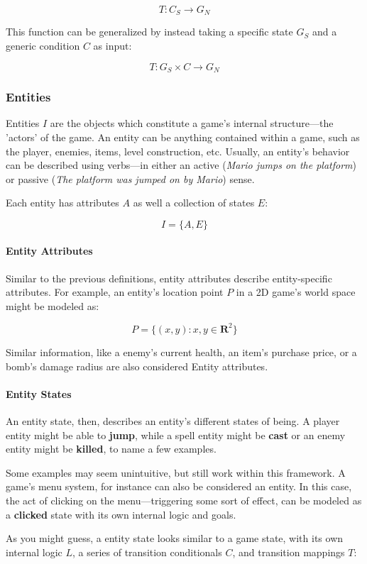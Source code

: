 \documentclass{report}
\begin{document}
$$
T: C_S \longrightarrow G_N
$$

This function can be generalized by instead taking a specific state $G_S$ and a generic condition $C$ as input:

$$
T: G_S \times C \longrightarrow G_N
$$

\subsubsection{Entities}
Entities $I$ are the objects which constitute a game's internal structure---the 'actors' of the game. An entity can be anything contained within a game, such as the player, enemies, items, level construction, etc.  Usually, an entity's behavior can be described using verbs---in either an active (\emph{Mario jumps on the platform}) or passive (\emph{The platform was jumped on by Mario}) sense.

Each entity has attributes $A$ as well a collection of states $E$:

$$I = \{A, E\}$$

\paragraph{Entity Attributes}
Similar to the previous definitions, entity attributes describe entity-specific attributes. For example, an entity's location point $P$ in a 2D game's world space might be modeled as:

$$P = \{(x,y): x,y \in \mathbf{R} ^2\}$$ 

Similar information, like a enemy's current health, an item's purchase price, or a bomb's damage radius are also considered Entity attributes. 

\paragraph{Entity States}
An entity state, then, describes an entity's different states of being. A player entity might be able to \textbf{jump}, while a spell entity might be \textbf{cast} or an enemy entity might be \textbf{killed}, to name a few examples. 

Some examples may seem unintuitive, but still work within this framework. A game's menu system, for instance can also be considered an entity. In this case, the act of clicking on the menu---triggering some sort of effect, can be modeled as a \textbf{clicked} state with its own internal logic and goals. 

As you might guess, a entity state looks similar to a game state, with its own internal logic $L$, a series of transition conditionals $C$, and transition mappings $T$:
\end{document}
